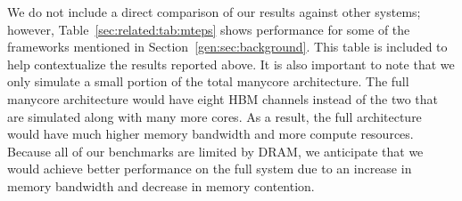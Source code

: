 We do not include a direct comparison of our results against other systems; however, Table~\ref{sec:related:tab:mteps} shows performance for some of the frameworks mentioned in Section~\ref{gen:sec:background}. This table is included to help contextualize the results reported above.
It is also important to note that we only simulate a small portion of the total manycore architecture. 
The full manycore architecture would have eight HBM channels instead of the two that are simulated along with many more cores.
As a result, the full architecture would have much higher memory bandwidth and more compute resources. 
Because all of our benchmarks are limited by DRAM, we anticipate that we would achieve better performance on the full system due to an increase in memory bandwidth and decrease in memory contention.

\relatedMTEPSTable